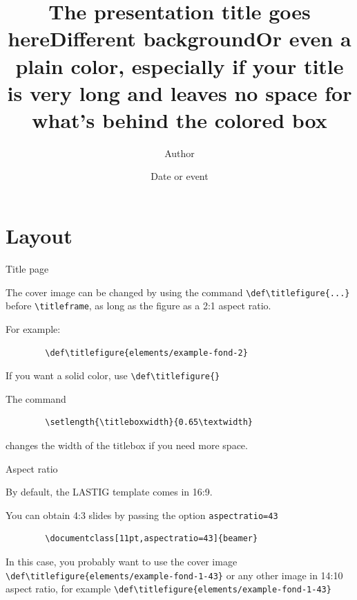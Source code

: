 \documentclass[11pt,aspectratio=169]{beamer}
\title[Short title]{The presentation title goes here}
\date[25.09.2025]{Date or event}
\author[Authors]{Author}
\institute[Institute]{Organizational Unit\\can spread over 2 lines}
\begin{document}

\titleframe

\def\titlefigure{elements/example-fond-2}
\title{Different background}
\titleframe

\def\titlefigure{}
\setlength{\titleboxwidth}{0.75\textwidth}			%
\title[Short title of the talk]{Or even a plain color, especially if your title is very long and leaves no space for what's behind the colored box}
\titleframe

\tocframe

\section{Layout}
\begin{frame}[fragile]{Title page}

	The cover image can be changed by using the command \verb+\def\titlefigure{...}+ before \verb+\titleframe+, as long as the figure as a 2:1 aspect ratio.
	
	For example:
	\begin{verbatim}
		\def\titlefigure{elements/example-fond-2}
	\end{verbatim}
	
	\medskip
	
	If you want a solid color, use \verb+\def\titlefigure{}+
	
	\medskip

	The command	
	\begin{verbatim}
		\setlength{\titleboxwidth}{0.65\textwidth}
	\end{verbatim}
	changes the width of the titlebox if you need more space.

\end{frame}
\begin{frame}[fragile]{Aspect ratio}

	By default, the LASTIG template comes in 16:9.
	
	You can obtain 4:3 slides by passing the option \verb+aspectratio=43+
	\begin{verbatim}
		\documentclass[11pt,aspectratio=43]{beamer}	
	\end{verbatim}
		
	\bigskip
	
	In this case, you probably want to use the cover image \verb+\def\titlefigure{elements/example-fond-1-43}+
	or any other image in 14:10 aspect ratio, for example \verb+\def\titlefigure{elements/example-fond-1-43}+
	
	
\end{frame}
\end{document}
